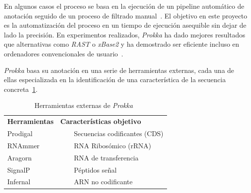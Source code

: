 En algunos casos el proceso se basa en la ejecución de un pipeline automático de anotación seguido de un proceso de filtrado manual~\cite{Stothard2006}. El objetivo en este proyecto es la automatización del proceso en un tiempo de ejecución asequible sin dejar de lado la precisión. En experimentos realizados, \textit{Prokka} ha dado mejores resultados que alternativas como \textit{RAST} o \textit{xBase2} y ha demostrado ser eficiente incluso en ordenadores convencionales de usuario~\cite{Seemann2014}.

\textit{Prokka} basa su anotación en una serie de herramientas  externas, cada una de ellas especializada en la identificación de una característica de la secuencia concreta~\ref{table:ProkkaTools}.

\begin{table}[!htb]

\begin{center}
\begin{tabularx}{\textwidth}{bb}
\arrayrulecolor{NavyBlue}\hline
\textbf{\textcolor{NavyBlue}{Herramientas}} &
\textbf{\textcolor{NavyBlue}{Características objetivo}}\\
\quad Prodigal~\cite{Hyatt2010} &
\begin{minipage}[t]{\linewidth}
~~~~Secuencias codificantes (CDS)
\end{minipage}\\

\quad RNAmmer~\cite{Lagesen2007} &
\begin{minipage}[t]{\linewidth}
~~~~RNA Ribosómico (rRNA)
\end{minipage}\\

\quad Aragorn~\cite{Laslett2004} &
\begin{minipage}[t]{\linewidth}
~~~~RNA de transferencia
\end{minipage}\\

\quad SignalP~\cite{Petersen2011} &
\begin{minipage}[t]{\linewidth}
~~~~Péptidos señal
\end{minipage}\\

\quad Infernal~\cite{Kolbe2011} &
\begin{minipage}[t]{\linewidth}
~~~~ARN no codificante
\end{minipage}\\
\hline
\end{tabularx}
\end{center}
\label{table:ProkkaTools}
\caption{Herramientas externas de \textit{Prokka}~\cite{Seemann2014}}
\end{table}

